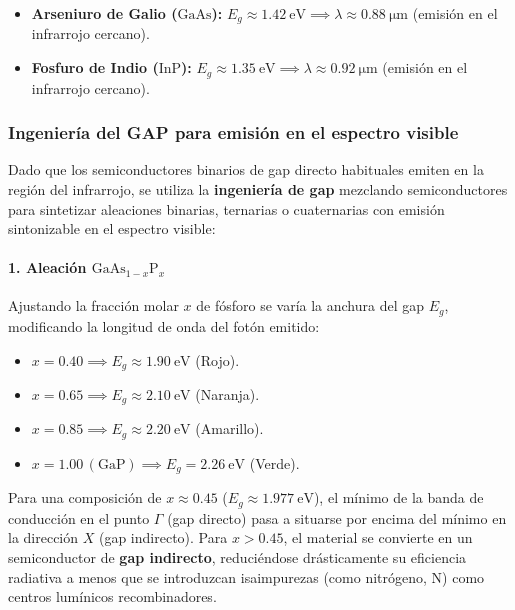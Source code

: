 \begin{itemize}
    \item \textbf{Arseniuro de Galio ($\text{GaAs}$):} $E_g \approx \SI{1.42}{\eV} \implies \lambda \approx \SI{0.88}{\micro\meter}$ (emisión en el infrarrojo cercano).
    \item \textbf{Fosfuro de Indio ($\text{InP}$):} $E_g \approx \SI{1.35}{\eV} \implies \lambda \approx \SI{0.92}{\micro\meter}$ (emisión en el infrarrojo cercano).
\end{itemize}

\subsubsection{Ingeniería del GAP para emisión en el espectro visible}

Dado que los semiconductores binarios de gap directo habituales emiten en la región del infrarrojo, se utiliza la \textbf{ingeniería de gap} mezclando semiconductores para sintetizar aleaciones binarias, ternarias o cuaternarias con emisión sintonizable en el espectro visible:

\paragraph{1. Aleación $\text{GaAs}_{1-x}\text{P}_x$}
Ajustando la fracción molar $x$ de fósforo se varía la anchura del gap $E_g$, modificando la longitud de onda del fotón emitido:
\begin{itemize}
    \item $x = 0.40 \implies E_g \approx \SI{1.90}{\eV}$ (Rojo).
    \item $x = 0.65 \implies E_g \approx \SI{2.10}{\eV}$ (Naranja).
    \item $x = 0.85 \implies E_g \approx \SI{2.20}{\eV}$ (Amarillo).
    \item $x = 1.00 \, (\text{GaP}) \implies E_g = \SI{2.26}{\eV}$ (Verde).
\end{itemize}

\begin{concepto}
Para una composición de $x \approx 0.45$ ($E_g \approx \SI{1.977}{\eV}$), el mínimo de la banda de conducción en el punto $\Gamma$ (gap directo) pasa a situarse por encima del mínimo en la dirección $X$ (gap indirecto). Para $x > 0.45$, el material se convierte en un semiconductor de \textbf{gap indirecto}, reduciéndose drásticamente su eficiencia radiativa a menos que se introduzcan isaimpurezas (como nitrógeno, $\text{N}$) como centros lumínicos recombinadores.
\end{concepto}

